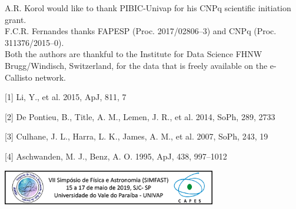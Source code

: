 \documentclass[a0paper,portrait]{baposter}
\begin{document}
\begin{poster}
{}

{A.R. Korol would like to thank PIBIC-Univap for his CNPq scientific initiation grant.\\
    F.C.R. Fernandes thanks FAPESP (Proc. 2017/02806--3) and CNPq (Proc. 311376/2015--0).\\
    Both the authors are thankful to the Institute for Data Science FHNW Brugg/Windisch, Switzerland,
    for the data that is freely available on the e-Callisto network.
}

{[1] Li, Y., et al. 2015, ApJ, 811, 7

[2] De Pontieu, B., Title, A. M., Lemen, J. R., et al. 2014, SoPh, 289, 2733

[3] Culhane, J. L., Harra, L. K., James, A. M., et al. 2007, SoPh, 243, 19

[4] Aschwanden, M. J., Benz, A. O. 1995, ApJ, 438, 997–1012

}


{\begin{center}
    \includegraphics[width=0.7\textwidth]{rodape_simfast.png}
\end{center}
}


\end{poster}
\end{document}
